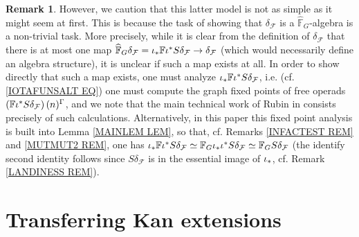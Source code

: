 \documentclass[a4paper,10pt
,draft
]{article}%
\numberwithin{equation}{section}
\numberwithin{figure}{section}
\theoremstyle{definition} %
\newtheorem{remark}[equation]{Remark}%
\newcommand{\1}{\ensuremath{\mathbbm 1}}%
\begin{document}
\begin{remark}
However, we caution that this latter
model is not as simple as it might seem at first.
This is because the task of showing that
$\delta_{\mathcal{F}}$
is a $\widehat{\mathbb{F}}_G$-algebra
is a non-trivial task.
More precisely, while it is clear from the 
definition of $\delta_{\mathcal{F}}$
that there is at most one map
$\widehat{\mathbb{F}}_G
\delta_{\mathcal{F}}
=
\iota_{\**} \mathbb{F} \iota^{\**} S \delta_{\mathcal{F}}
\to 
\delta_{\mathcal{F}}$
(which would necessarily define an algebra structure),
it is unclear if such a map exists at all.
In order to show directly that such a map exists,
one must analyze 
$\iota_{\**} \mathbb{F} \iota^{\**} S \delta_{\mathcal{F}}$,
i.e. (cf. \eqref{IOTAFUNSALT EQ}) one must compute 
the graph fixed points of free operads
$\left(\mathbb{F} \iota^{\**} S \delta_{\mathcal{F}}\right)
(n)^{\Gamma}$,
and we note that the main technical work of 
Rubin in \cite{Rub17} consists precisely of such calculations.
Alternatively, in this paper this fixed point analysis is built into 
Lemma \ref{MAINLEM LEM},
so that, cf. Remarks \ref{INFACTEST REM} and \ref{MUTMUT2 REM},
one has 
$\iota_{\**} \mathbb{F} \iota^{\**} S \delta_{\mathcal{F}}
\simeq 
\mathbb{F}_G \iota_{\**} \iota^{\**} S \delta_{\mathcal{F}}
\simeq
\mathbb{F}_G S \delta_{\mathcal{F}}$
(the identify
second identity follows since
$S \delta_{\mathcal{F}}$
is in the essential image of $\iota_{\**}$,
cf. Remark \ref{LANDINESS REM}).
%
\end{remark}






\appendix


\section{Transferring Kan extensions}
\label{TRANSKAN AP}
\end{document}
